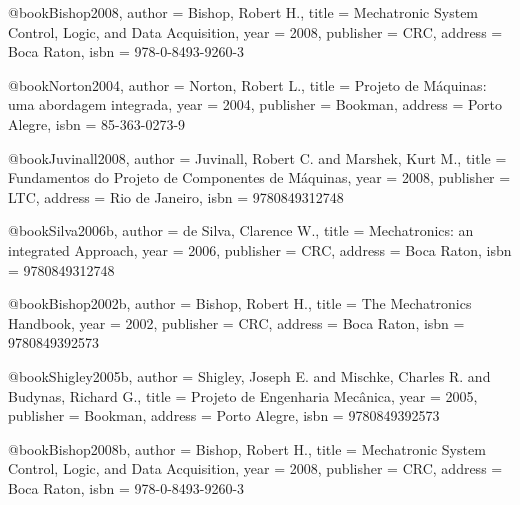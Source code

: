 @book{Bishop2008,
  author = {Bishop, Robert H.},
  title = {Mechatronic System Control, Logic, and Data Acquisition},
  year = {2008},
  publisher = {CRC},
  address = {Boca Raton},
  isbn = {978-0-8493-9260-3}
}

@book{Norton2004,
  author = {Norton, Robert L.},
  title = {Projeto de Máquinas: uma abordagem integrada},
  year = {2004},
  publisher = {Bookman},
  address = {Porto Alegre},
  isbn = {85-363-0273-9}
}

%

@book{Juvinall2008,
  author = {Juvinall, Robert C. and Marshek, Kurt M.},
  title = {Fundamentos do Projeto de Componentes de Máquinas},
  year = {2008},
  publisher = {LTC},
  address = {Rio de Janeiro},
  isbn = {9780849312748}
}

@book{Silva2006b,
  author = {de Silva, Clarence W.},
  title = {Mechatronics: an integrated Approach},
  year = {2006},
  publisher = {CRC},
  address = {Boca Raton},
  isbn = {9780849312748}
}

@book{Bishop2002b,
  author = {Bishop, Robert H.},
  title = {The Mechatronics Handbook},
  year = {2002},
  publisher = {CRC},
  address = {Boca Raton},
  isbn = {9780849392573}
}

@book{Shigley2005b,
  author = {Shigley, Joseph E. and Mischke, Charles R. and Budynas, Richard G.},
  title = {Projeto de Engenharia Mecânica},
  year = {2005},
  publisher = {Bookman},
  address = {Porto Alegre},
  isbn = {9780849392573}
}

@book{Bishop2008b,
  author = {Bishop, Robert H.},
  title = {Mechatronic System Control, Logic, and Data Acquisition},
  year = {2008},
  publisher = {CRC},
  address = {Boca Raton},
  isbn = {978-0-8493-9260-3}
}

